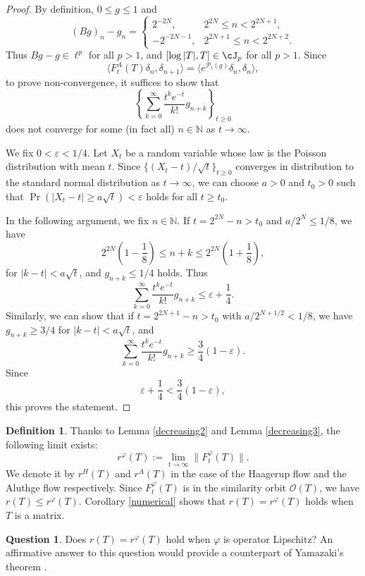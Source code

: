 \documentclass[12pt]{article}
\theoremstyle{definition}
\newtheorem{definition}[theorem]{Definition}
\newtheorem{question}[theorem]{Question}
\numberwithin{equation}{section}
\newcommand{\N}{\mathbb{N}}
\newcommand{\cO}{\mathcal{O}} \newcommand{\cP}{\mathcal{P}}
\newcommand{\inpr}[2]{\langle{#1,#2}\rangle}
\begin{document}
\begin{proof} By definition, $0\leq g\leq 1$ and  
\[(Bg)_n-g_n=\begin{cases}
	2^{-2N},  &  2^{2N}\leq n < 2^{2N+1}, \\
	-2^{-2N-1},  &  2^{2N+1}\leq n< 2^{2N+2}.
\end{cases}  
\]
Thus $Bg-g\in \ell^p$ for all $p>1$, and  $[\log|T|,T]\in \cJ_p$ for all $p>1$. 
Since 
\[\inpr{F^A_t(T)\delta_n}{\delta_{n+1}}=\inpr{e^{\cP_t(g)}\delta_n}{\delta_n},\]
to prove non-convergence, it suffices to show that 
\[\left\{\sum_{k=0}^\infty \frac{t^ke^{-t}}{k!}g_{n+k}\right\}_{t\geq 0}\]
does not converge for some (in fact all) $n\in \N$ as $t\to\infty$. 

We fix $0<\varepsilon <1/4$. 
Let $X_t$ be a random variable whose law is the Poisson distribution with mean $t$. 
Since $\{(X_t-t)/\sqrt{t}\}_{t\geq 0}$ converges in distribution to the standard normal distribution 
as $t\to \infty$, we can choose $a>0$ and $t_0>0$ such that 
$\operatorname{Pr}(|X_t-t|\geq a\sqrt{t})<\varepsilon$ holds for all $t\geq t_0$.

In the following argument, we fix $n\in \N$.   
If $t=2^{2N}-n>t_0$ and $a/2^N\leq 1/8$, we have
\[2^{2N}(1-\frac{1}{8})\leq n+k\leq 2^{2N}(1+\frac{1}{8}),\]
for $|k-t|<a\sqrt{t}$, and $g_{n+k}\leq 1/4$ holds. 
Thus   
\[\sum_{k=0}^\infty \frac{t^ke^{-t}}{k!}g_{n+k}\leq \varepsilon+\frac{1}{4}.\]
Similarly, we can show that  if $t=2^{2N+1}-n>t_0$ with $a/2^{N+1/2}<1/8$, 
we have $g_{n+k}\geq 3/4$ for $|k-t|<a\sqrt{t}$, and 
\[\sum_{k=0}^\infty \frac{t^ke^{-t}}{k!}g_{n+k}\geq\frac{3}{4}(1-\varepsilon).\]
Since 
\[\varepsilon+\frac{1}{4}<\frac{3}{4}(1-\varepsilon),\]
this proves the statement. 
\end{proof}


\begin{definition}Thanks to Lemma \ref{decreasing2} and Lemma \ref{decreasing3}, the following limit exists: 
\[r^\varphi(T):=\lim_{t\to\infty}\|F^\varphi_t(T)\|.\]
We denote it by $r^H(T)$ and $r^A(T)$ in the case of the Haagerup flow and the Aluthge flow respectively. 
Since $F^\varphi_t(T)$ is in the similarity orbit $\cO(T)$, we have $r(T)\leq r^\varphi(T)$. 
Corollary \ref{numerical} shows that $r(T)=r^\varphi(T)$ holds when $T$ is a matrix. 
\end{definition}

\begin{question} Does $r(T)=r^\varphi(T)$ hold when $\varphi$ is operator Lipschitz? 
An affirmative answer to this question would provide a counterpart of Yamazaki's theorem \cite[Theorem 1]{Y2002}.    
\end{question}
\end{document}

